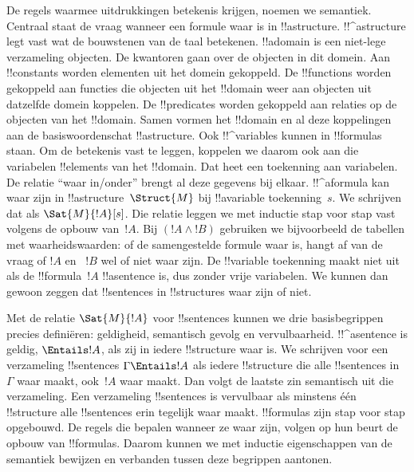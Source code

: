 \documentclass[../../../include/open-logic-section]{subfiles}
\begin{document}


De regels waarmee uitdrukkingen betekenis krijgen, noemen we
semantiek. Centraal staat de vraag wanneer een formule waar is in
!!a{structure}. !!^a{structure} legt vast wat de bouwstenen van de taal
betekenen. !!a{domain} is een niet-lege verzameling objecten. De
kwantoren gaan over de objecten in dit domein. Aan !!{constant}s worden
elementen uit het domein gekoppeld. De !!{function}s worden gekoppeld
aan functies die objecten uit het !!{domain} weer aan objecten uit
datzelfde domein koppelen. De !!{predicate}s worden gekoppeld aan
relaties op de objecten van het !!{domain}. Samen vormen het
!!{domain} en al deze koppelingen aan de basiswoordenschat
!!a{structure}. Ook !!^{variable}s kunnen in !!{formula}s staan. Om de
betekenis vast te leggen, koppelen we daarom ook aan die variabelen
!!{element}s van het !!{domain}. Dat heet een toekenning aan
variabelen. De relatie ``waar in/onder'' brengt al deze gegevens bij
elkaar. !!^a{formula} kan waar zijn in !!a{structure}~$\Struct{M}$ bij
!!a{variable} toekenning~$s$. We schrijven dat als
$\Sat{M}{!A}[s]$. Die relatie leggen we met inductie stap voor stap
vast volgens de opbouw van~$!A$. Bij $(!A \land !B)$ gebruiken we
bijvoorbeeld de tabellen met waarheidswaarden: of de samengestelde
formule waar is, hangt af van de vraag of $!A$ en ~$!B$ wel of niet
waar zijn. De !!{variable} toekenning maakt niet uit als de
!!{formula}~$!A$ !!a{sentence} is, dus zonder vrije variabelen. We
kunnen dan gewoon zeggen dat !!{sentence}s in !!{structure}s waar zijn
of niet.

Met de relatie $\Sat{M}{!A}$ voor !!{sentence}s kunnen we drie
basisbegrippen precies definiëren: geldigheid, semantisch gevolg en
vervulbaarheid. !!^a{sentence} is geldig, $\Entails !A$, als zij in
iedere !!{structure} waar is. We schrijven voor een verzameling
!!{sentence}s $\Gamma \Entails !A$ als iedere !!{structure} die alle
!!{sentence}s in~$\Gamma$ waar maakt, ook~$!A$ waar maakt. Dan volgt de
laatste zin semantisch uit die verzameling. Een verzameling
!!{sentence}s is vervulbaar als minstens één !!{structure} alle
!!{sentence}s erin tegelijk waar maakt. !!{formula}s zijn stap voor
stap opgebouwd. De regels die bepalen wanneer ze waar zijn, volgen op
hun beurt de opbouw van !!{formula}s. Daarom kunnen we met inductie
eigenschappen van de semantiek bewijzen en verbanden tussen deze
begrippen aantonen.
\end{document}
